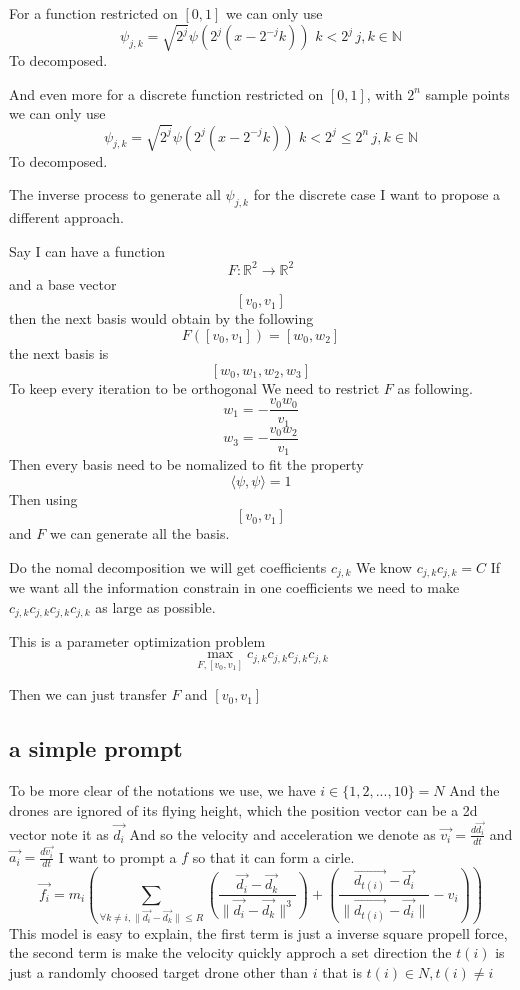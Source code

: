 \documentclass{article}
\theoremstyle{definition} %
\begin{document}
For a function restricted on
\([0,1]\) we can only use
\[
    \psi_{j,k}=\sqrt{2^j}\psi(2^j(x-2^{-j}k)) \,
    \, k<2^j \, j,k\in \mathbb{N}
\]
To decomposed.

And even more for a discrete function restricted on
\([0,1]\), with \(2^n\) sample points we can only use
\[
    \psi_{j,k}=\sqrt{2^j}\psi(2^j(x-2^{-j}k)) \,
    \, k<2^j\leq2^n \, j,k\in \mathbb{N}
\]
To decomposed.

The inverse process to generate all \(\psi_{j,k}\)
for the discrete case I want to propose a different
approach.

Say I can have a function
\[
    F:\mathbb{R}^2\to\mathbb{R}^2
\]
and a base vector
\[
    [v_0,v_1]
\]
then the next basis would obtain by
the following
\[
    F([v_0,v_1])=[w_0,w_2]
\]
the next basis is
\[
    [w_0,w_1,w_2,w_3]
\]
To keep every iteration to be orthogonal
We need to restrict \(F\)
as following.
\[
    w_1=-\frac{v_0w_0}{v_1}
\]
\[
    w_3=-\frac{v_0w_2}{v_1}
\]
Then every basis need to be nomalized
to fit the property
\[
    \langle\psi,\psi\rangle=1
\]
Then using
\[
    [v_0,v_1]
\]
and \(F\)
we can generate all the basis.

Do the nomal decomposition we will
get coefficients \(c_{j,k}\)
We know \(c_{j,k}c_{j,k}=C\)
If we want all the information
constrain in one coefficients
we need to make
\(c_{j,k}c_{j,k}c_{j,k}c_{j,k}\)
as large as possible.

This is a parameter optimization
problem
\[
    \max_{F,[v_0,v_1]}c_{j,k}c_{j,k}c_{j,k}c_{j,k}
\]

Then we can just transfer \(F\) and \([v_0,v_1]\)




\subsection{a simple prompt}
To be more clear of the notations we use,
we have \(i\in\{1,2,...,10\}=N\)
And the drones are ignored of its flying
height, which the position vector can be a
2d vector note it as \(\vec{d_i}\)
And so the velocity and acceleration we denote as
\(\vec{v_i}=\frac{d\vec{d_i}}{dt}\)
and
\(\vec{a_i}=\frac{d\vec{v_i}}{dt}\)
I want to prompt a \(f\) so that it can form
a cirle.
\[
    \vec{f_i}=m_i(\sum_{\forall k\neq i,\|\vec{d_i}-\vec{d_k}\|\leq R}(\frac{\vec{d_i}-\vec{d_k}}{\|\vec{d_i}-\vec{d_k}\|^3})+(\frac{\vec{d_{t(i)}}-\vec{d_i}}{\|\vec{d_{t(i)}}-\vec{d_i}\|}-v_i))
\]
This model is easy to explain, the first term is
just a inverse square propell force, the second
term is make the velocity quickly approch a set direction
the \(t(i)\) is just a randomly choosed target drone
other than \(i\) that is \(t(i)\in N, t(i)\neq i\)
\end{document}

